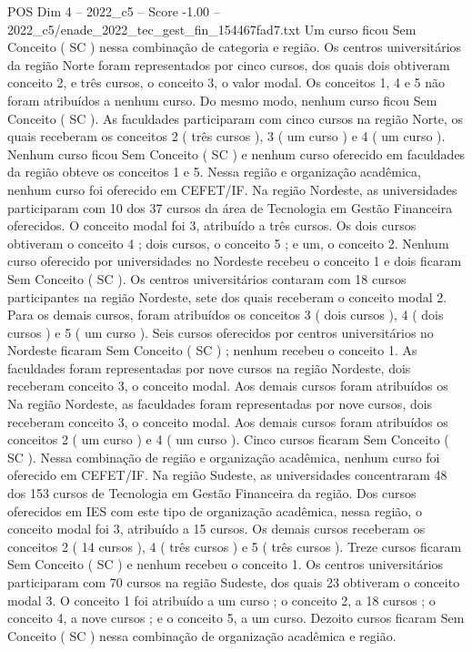\begin{textsample}{POS Dim 4 – 2022\_c5 – Score -1.00 – 2022\_c5/enade\_2022\_tec\_gest\_fin\_154467fad7.txt}
Um curso ficou Sem Conceito ( SC ) nessa combinação de categoria e região.
Os centros universitários da região Norte foram representados por cinco cursos, dos quais dois obtiveram conceito 2, e três cursos, o conceito 3, o valor modal.
Os conceitos 1, 4 e 5 não foram atribuídos a nenhum curso.
Do mesmo modo, nenhum curso ficou Sem Conceito ( SC ).
As faculdades participaram com cinco cursos na região Norte, os quais receberam os conceitos 2 ( três cursos ), 3 ( um curso ) e 4 ( um curso ).
Nenhum curso ficou Sem Conceito ( SC ) e nenhum curso oferecido em faculdades da região obteve os conceitos 1 e 5.
Nessa região e organização acadêmica, nenhum curso foi oferecido em CEFET/IF.
Na região Nordeste, as universidades participaram com 10 dos 37 cursos da área de Tecnologia em Gestão Financeira oferecidos.
O conceito modal foi 3, atribuído a três cursos.
Os dois cursos obtiveram o conceito 4 ; dois cursos, o conceito 5 ; e um, o conceito 2.
Nenhum curso oferecido por universidades no Nordeste recebeu o conceito 1 e dois ficaram Sem Conceito ( SC ).
Os centros universitários contaram com 18 cursos participantes na região Nordeste, sete dos quais receberam o conceito modal 2.
Para os demais cursos, foram atribuídos os conceitos 3 ( dois cursos ), 4 ( dois cursos ) e 5 ( um curso ).
Seis cursos oferecidos por centros universitários no Nordeste ficaram Sem Conceito ( SC ) ; nenhum recebeu o conceito 1.
As faculdades foram representadas por nove cursos na região Nordeste, dois receberam conceito 3, o conceito modal.
Aos demais cursos foram atribuídos os Na região Nordeste, as faculdades foram representadas por nove cursos, dois receberam conceito 3, o conceito modal.
Aos demais cursos foram atribuídos os conceitos 2 ( um curso ) e 4 ( um curso ).
Cinco cursos ficaram Sem Conceito ( SC ).
Nessa combinação de região e organização acadêmica, nenhum curso foi oferecido em CEFET/IF.
Na região Sudeste, as universidades concentraram 48 dos 153 cursos de Tecnologia em Gestão Financeira da região.
Dos cursos oferecidos em IES com este tipo de organização acadêmica, nessa região, o conceito modal foi 3, atribuído a 15 cursos.
Os demais cursos receberam os conceitos 2 ( 14 cursos ), 4 ( três cursos ) e 5 ( três cursos ).
Treze cursos ficaram Sem Conceito ( SC ) e nenhum recebeu o conceito 1.
Os centros universitários participaram com 70 cursos na região Sudeste, dos quais 23 obtiveram o conceito modal 3.
O conceito 1 foi atribuído a um curso ; o conceito 2, a 18 cursos ; o conceito 4, a nove cursos ; e o conceito 5, a um curso.
Dezoito cursos ficaram Sem Conceito ( SC ) nessa combinação de organização acadêmica e região.

\end{textsample}
